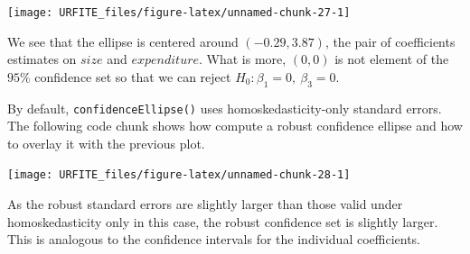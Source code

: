 \documentclass[]{book}
\newenvironment{Shaded}{\begin{snugshade}}{\end{snugshade}}
\newcommand{\KeywordTok}[1]{\textcolor[rgb]{0.13,0.29,0.53}{\textbf{#1}}}
\newcommand{\DataTypeTok}[1]{\textcolor[rgb]{0.13,0.29,0.53}{#1}}
\newcommand{\DecValTok}[1]{\textcolor[rgb]{0.00,0.00,0.81}{#1}}
\newcommand{\StringTok}[1]{\textcolor[rgb]{0.31,0.60,0.02}{#1}}
\newcommand{\CommentTok}[1]{\textcolor[rgb]{0.56,0.35,0.01}{\textit{#1}}}
\newcommand{\NormalTok}[1]{#1}
\theoremstyle{definition}
\theoremstyle{definition}
\theoremstyle{definition}
\theoremstyle{remark}
\begin{document}
\begin{center}\texttt{[image: URFITE\_files/figure-latex/unnamed-chunk-27-1]} \end{center}

We see that the ellipse is centered around \((-0.29, 3.87)\), the pair
of coefficients estimates on \(size\) and \(expenditure\). What is more,
\((0,0)\) is not element of the \(95\%\) confidence set so that we can
reject \(H_0: \beta_1 = 0, \ \beta_3 = 0\).

By default, \texttt{confidenceEllipse()} uses homoskedasticity-only
standard errors. The following code chunk shows how compute a robust
confidence ellipse and how to overlay it with the previous plot.

\begin{Shaded}
\end{Shaded}

\begin{center}\texttt{[image: URFITE\_files/figure-latex/unnamed-chunk-28-1]} \end{center}

As the robust standard errors are slightly larger than those valid under
homoskedasticity only in this case, the robust confidence set is
slightly larger. This is analogous to the confidence intervals for the
individual coefficients.
\end{document}
